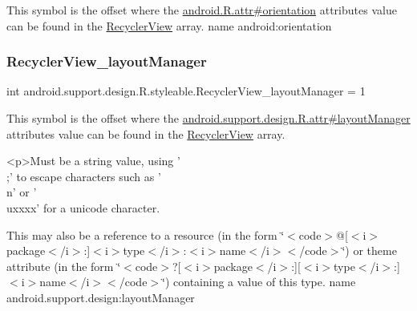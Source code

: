 This symbol is the offset where the \hyperlink{}{android.\+R.\+attr\#orientation} attribute\textquotesingle{}s value can be found in the \hyperlink{classandroid_1_1support_1_1design_1_1R_1_1styleable_a1700d79470c52662f934bd53b1a05a14}{Recycler\+View} array.  name android\+:orientation \mbox{\label{classandroid_1_1support_1_1design_1_1R_1_1styleable_ab43560bb439ac1da32a6c932be37da34}} 
\subsubsection{\texorpdfstring{Recycler\+View\+\_\+layout\+Manager}{RecyclerView\_layoutManager}}
{\footnotesize\ttfamily int android.\+support.\+design.\+R.\+styleable.\+Recycler\+View\+\_\+layout\+Manager = 1\hspace{0.3cm}{\ttfamily [static]}}

This symbol is the offset where the \hyperlink{classandroid_1_1support_1_1design_1_1R_1_1attr_aee29483605d29525a26ab9121d9b7225}{android.\+support.\+design.\+R.\+attr\#layout\+Manager} attribute\textquotesingle{}s value can be found in the \hyperlink{classandroid_1_1support_1_1design_1_1R_1_1styleable_a1700d79470c52662f934bd53b1a05a14}{Recycler\+View} array.

\begin{DoxyVerb}      <p>Must be a string value, using '\\;' to escape characters such as '\\n' or '\\uxxxx' for a unicode character.
\end{DoxyVerb}
 

This may also be a reference to a resource (in the form \char`\"{}$<$code$>$@\mbox{[}$<$i$>$package$<$/i$>$\+:\mbox{]}$<$i$>$type$<$/i$>$\+:$<$i$>$name$<$/i$>$$<$/code$>$\char`\"{}) or theme attribute (in the form \char`\"{}$<$code$>$?\mbox{[}$<$i$>$package$<$/i$>$\+:\mbox{]}\mbox{[}$<$i$>$type$<$/i$>$\+:\mbox{]}$<$i$>$name$<$/i$>$$<$/code$>$\char`\"{}) containing a value of this type.  name android.\+support.\+design\+:layout\+Manager \mbox{\label{classandroid_1_1support_1_1design_1_1R_1_1styleable_a29f1bf6c63be4868df7196198618fd81}} 
